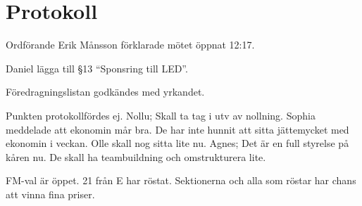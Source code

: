 \documentclass[10pt]{article}
\def\mo{Erik Månsson}
\begin{document}
\section*{Protokoll}
\begin{paragrafer}
Ordförande {\mo} förklarade mötet öppnat 12:17.

{\valavmo}

{\valavms}

{\valavj}

{\tosg}

{\ingaadj}


Daniel \ypa lägga till \S13 ``Sponsring till LED''.

Föredragningslistan godkändes med yrkandet.


\begin{fyllnadsval} %
\end{fyllnadsval}

\begin{paragrafer}
Punkten protokollfördes ej.
Nollu; Skall ta tag i utv av nollning.
Sophia meddelade att ekonomin mår bra. De har inte hunnit att sitta jättemycket med ekonomin i veckan. Olle skall nog sitta lite nu.
Agnes;
Det är en full styrelse på kåren nu. De skall ha teambuildning och omstrukturera lite.

FM-val är öppet. 21 från E har röstat. Sektionerna och alla som röstar har chans att vinna fina priser.


\end{paragrafer}
\end{paragrafer}
\end{document}
